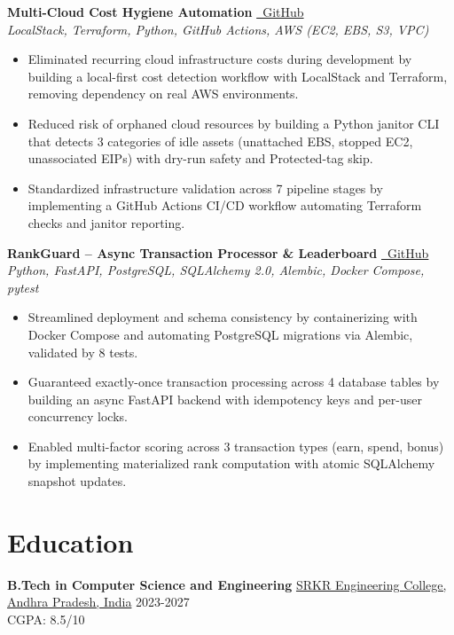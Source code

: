 \documentclass[10pt, letterpaper]{article}
\begin{document}
\vspace{3pt}
\noindent \textbf{Multi-Cloud Cost Hygiene Automation} \href{https://github.com/SoulByte07/Multi-Cloud-Cost-Hygiene-Automation}{\faGithub\ GitHub} \\
\textit{LocalStack, Terraform, Python, GitHub Actions, AWS (EC2, EBS, S3, VPC)}
\begin{itemize}
    \item Eliminated recurring cloud infrastructure costs during development by building a local-first cost detection workflow with LocalStack and Terraform, removing dependency on real AWS environments.
    \item Reduced risk of orphaned cloud resources by building a Python janitor CLI that detects 3 categories of idle assets (unattached EBS, stopped EC2, unassociated EIPs) with dry-run safety and Protected-tag skip.
    \item Standardized infrastructure validation across 7 pipeline stages by implementing a GitHub Actions CI/CD workflow automating Terraform checks and janitor reporting.
\end{itemize}

\vspace{3pt}
\noindent \textbf{RankGuard – Async Transaction Processor \& Leaderboard} \href{https://github.com/SoulByte07/RankGuard}{\faGithub\ GitHub} \\
\textit{Python, FastAPI, PostgreSQL, SQLAlchemy 2.0, Alembic, Docker Compose, pytest}
\begin{itemize}
    \item Streamlined deployment and schema consistency by containerizing with Docker Compose and automating PostgreSQL migrations via Alembic, validated by 8 tests.
    \item Guaranteed exactly-once transaction processing across 4 database tables by building an async FastAPI backend with idempotency keys and per-user concurrency locks.
    \item Enabled multi-factor scoring across 3 transaction types (earn, spend, bonus) by implementing materialized rank computation with atomic SQLAlchemy snapshot updates.
\end{itemize}

\section{Education}
\noindent \textbf{B.Tech in Computer Science and Engineering} \href{https://srkrec.edu.in/}{SRKR Engineering College, Andhra Pradesh, India} \hfill 2023-2027 \\
CGPA: 8.5/10
\end{document}
